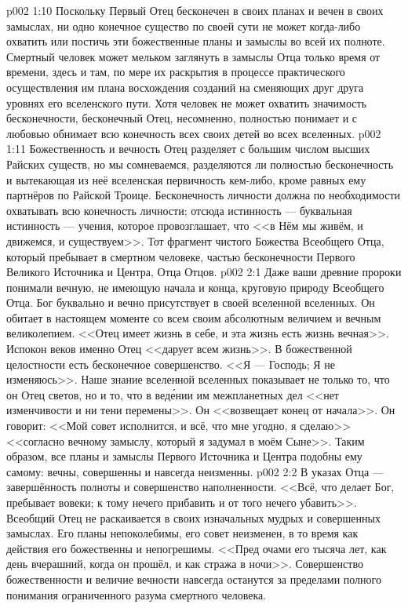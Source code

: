 \vs p002 1:10 \pc Поскольку Первый Отец бесконечен в своих планах и вечен в своих замыслах, ни одно конечное существо по своей сути не может когда\hyp{}либо охватить или постичь эти божественные планы и замыслы во всей их полноте. Смертный человек может мельком заглянуть в замыслы Отца только время от времени, здесь и там, по мере их раскрытия в процессе практического осуществления им плана восхождения созданий на сменяющих друг друга уровнях его вселенского пути. Хотя человек не может охватить значимость бесконечности, бесконечный Отец, несомненно, полностью понимает и с любовью обнимает всю конечность всех своих детей во всех вселенных.
\vs p002 1:11 Божественность и вечность Отец разделяет с большим числом высших Райских существ, но мы сомневаемся, разделяются ли полностью бесконечность и вытекающая из неё вселенская первичность кем\hyp{}либо, кроме равных ему партнёров по Райской Троице. Бесконечность личности должна по необходимости охватывать всю конечность личности; отсюда истинность --- буквальная истинность --- учения, которое провозглашает, что <<в Нём мы живём, и движемся, и существуем>>. Тот фрагмент чистого Божества Всеобщего Отца, который пребывает в смертном человеке,  частью бесконечности Первого Великого Источника и Центра, Отца Отцов.
\vs p002 2:1 Даже ваши древние пророки понимали вечную, не имеющую начала и конца, круговую природу Всеобщего Отца. Бог буквально и вечно присутствует в своей вселенной вселенных. Он обитает в настоящем моменте со всем своим абсолютным величием и вечным великолепием. <<Отец имеет жизнь в себе, и эта жизнь есть жизнь вечная>>. Испокон веков именно Отец <<дарует всем жизнь>>. В божественной целостности есть бесконечное совершенство. <<Я --- Господь; Я не изменяюсь>>. Наше знание вселенной вселенных показывает не только то, что он Отец светов, но и то, что в вед\'ении им межпланетных дел <<нет изменчивости и ни тени перемены>>. Он <<возвещает конец от начала>>. Он говорит: <<Мой совет исполнится, и всё, что мне угодно, я сделаю>> <<согласно вечному замыслу, который я задумал в моём Сыне>>. Таким образом, все планы и замыслы Первого Источника и Центра подобны ему самому: вечны, совершенны и навсегда неизменны.
\vs p002 2:2 В указах Отца --- завершённость полноты и совершенство наполненности. <<Всё, что делает Бог, пребывает вовеки; к тому нечего прибавить и от того нечего убавить>>. Всеобщий Отец не раскаивается в своих изначальных мудрых и совершенных замыслах. Его планы непоколебимы, его совет неизменен, в то время как действия его божественны и непогрешимы. <<Пред очами его тысяча лет, как день вчерашний, когда он прошёл, и как стража в ночи>>. Совершенство божественности и величие вечности навсегда останутся за пределами полного понимания ограниченного разума смертного человека.
